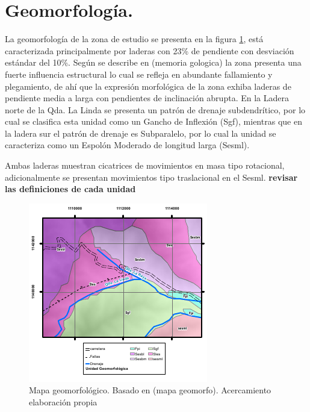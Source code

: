 \section{Geomorfolog\'{i}a.}
La geomorfolog\'{i}a de la zona de estudio se presenta en la figura \ref{fig:mapageomorfo}, est\'{a} caracterizada principalmente por laderas con 23\% de pendiente con desviaci\'{o}n est\'{a}ndar del 10\%.
Seg\'{u}n se describe en (memoria gologica) la zona presenta una fuerte influencia estructural lo cual se refleja en abundante fallamiento y plegamiento, de ah\'i que la expresi\'{o}n morfol\'{o}gica de la zona exhiba laderas de pendiente media a larga con pendientes de inclinaci\'{o}n abrupta. En la Ladera norte de la Qda. La Linda se presenta un patr\'{o}n de drenaje subdendr\'{i}tico, por lo cual se clasifica esta unidad como un Gancho de Inflexi\'{o}n (Sgf), mientras que en la ladera sur el patr\'{o}n de drenaje es Subparalelo, por lo cual la unidad se caracteriza como un Espol\'{o}n Moderado de longitud larga (Sesml).\par
Ambas laderas muestran cicatrices de movimientos en masa tipo rotacional, adicionalmente se presentan movimientos tipo traslacional en el Sesml. 
 \textbf{revisar las definiciones de cada unidad}\par


\begin{figure}[H]
\centering

\includegraphics[width=.8\textwidth]{img/geomorfo.pdf}
\caption{Mapa geomorfol\'{o}gico. Basado en (mapa geomorfo). Acercamiento elaboraci\'on propia}

\label{fig:mapageomorfo}
\end{figure}